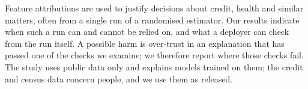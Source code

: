 Feature attributions are used to justify decisions about credit, health and similar matters, often from a single run of a randomised estimator. Our results indicate when such a run can and cannot be relied on, and what a deployer can check from the run itself. A possible harm is over-trust in an explanation that has passed one of the checks we examine; we therefore report where those checks fail. The study uses public data only and explains models trained on them; the credit and census data concern people, and we use them as released.
